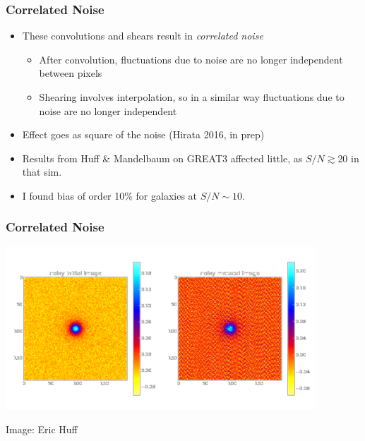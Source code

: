 \documentclass{beamer}
\begin{document}
\frame
{
    \frametitle{Correlated Noise}

 
    \begin{itemize}

        \item These convolutions and shears result in {\em {\color{brightred} correlated noise}}
            
        \begin{itemize}
            \item After convolution, fluctuations due to noise are no longer
                independent between pixels

            \item Shearing involves interpolation, so in a similar way fluctuations
                due to noise are no longer independent
        \end{itemize}

    \item Effect goes as {\color{orange} square} of the noise (Hirata 2016, in prep)

        \item Results from Huff \& Mandelbaum on GREAT3 affected little, as
            $S/N \gtrsim 20$ in that sim.

        \item I found bias of order 10\% for galaxies at $S/N \sim 10$.



    \end{itemize}

}
\frame
{
    \frametitle{Correlated Noise}
 
    \begin{center}
        \includegraphics[scale=1]{metacal_noise_images_neg_crop.png}
        \newline
    \end{center}
    {\small Image: Eric Huff}

}
\end{document}
